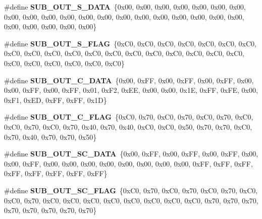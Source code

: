 \begin{DoxyCompactItemize}
\item 
\mbox{\label{unit-test-cpu-dispatch_8c_abfa2dcf4f03c6c5d74854d48aec18548}} 
\#define {\bfseries S\+U\+B\+\_\+\+O\+U\+T\+\_\+\+S\+\_\+\+D\+A\+TA}~\{0x00, 0x00, 0x00, 0x00, 0x00, 0x00, 0x00, 0x00, 0x00, 0x00, 0x00, 0x00, 0x00, 0x00, 0x00, 0x00, 0x00, 0x00, 0x00, 0x00, 0x00, 0x00, 0x00, 0x00, 0x00\}
\item 
\mbox{\label{unit-test-cpu-dispatch_8c_a9c9721a601578ce247115487e69375c6}} 
\#define {\bfseries S\+U\+B\+\_\+\+O\+U\+T\+\_\+\+S\+\_\+\+F\+L\+AG}~\{0x\+C0, 0x\+C0, 0x\+C0, 0x\+C0, 0x\+C0, 0x\+C0, 0x\+C0, 0x\+C0, 0x\+C0, 0x\+C0, 0x\+C0, 0x\+C0, 0x\+C0, 0x\+C0, 0x\+C0, 0x\+C0, 0x\+C0, 0x\+C0, 0x\+C0, 0x\+C0, 0x\+C0, 0x\+C0, 0x\+C0, 0x\+C0, 0x\+C0\}
\item 
\mbox{\label{unit-test-cpu-dispatch_8c_a82eed4c782439d39142ddbdd911090a0}} 
\#define {\bfseries S\+U\+B\+\_\+\+O\+U\+T\+\_\+\+C\+\_\+\+D\+A\+TA}~\{0x00, 0x\+F\+F, 0x00, 0x\+F\+F, 0x00, 0x\+F\+F, 0x00, 0x00, 0x\+F\+F, 0x00, 0x\+F\+F, 0x01, 0x\+F2, 0x\+E\+E, 0x00, 0x00, 0x1\+E, 0x\+F\+F, 0x\+F\+E, 0x00, 0x\+F1, 0x\+E\+D, 0x\+F\+F, 0x\+F\+F, 0x1\+D\}
\item 
\mbox{\label{unit-test-cpu-dispatch_8c_a740c259cf08a9a231c29d4de0015673c}} 
\#define {\bfseries S\+U\+B\+\_\+\+O\+U\+T\+\_\+\+C\+\_\+\+F\+L\+AG}~\{0x\+C0, 0x70, 0x\+C0, 0x70, 0x\+C0, 0x70, 0x\+C0, 0x\+C0, 0x70, 0x\+C0, 0x70, 0x40, 0x70, 0x40, 0x\+C0, 0x\+C0, 0x50, 0x70, 0x70, 0x\+C0, 0x70, 0x40, 0x70, 0x70, 0x50\}
\item 
\mbox{\label{unit-test-cpu-dispatch_8c_aae8a6a7276a1df10c3a7ed1766a3bf3b}} 
\#define {\bfseries S\+U\+B\+\_\+\+O\+U\+T\+\_\+\+S\+C\+\_\+\+D\+A\+TA}~\{0x00, 0x\+F\+F, 0x00, 0x\+F\+F, 0x00, 0x\+F\+F, 0x00, 0x00, 0x\+F\+F, 0x00, 0x00, 0x00, 0x00, 0x00, 0x00, 0x00, 0x00, 0x\+F\+F, 0x\+F\+F, 0x\+F\+F, 0x\+F\+F, 0x\+F\+F, 0x\+F\+F, 0x\+F\+F, 0x\+F\+F\}
\item 
\mbox{\label{unit-test-cpu-dispatch_8c_a17607a97ae4b0294acd737762fce6982}} 
\#define {\bfseries S\+U\+B\+\_\+\+O\+U\+T\+\_\+\+S\+C\+\_\+\+F\+L\+AG}~\{0x\+C0, 0x70, 0x\+C0, 0x70, 0x\+C0, 0x70, 0x\+C0, 0x\+C0, 0x70, 0x\+C0, 0x\+C0, 0x\+C0, 0x\+C0, 0x\+C0, 0x\+C0, 0x\+C0, 0x\+C0, 0x70, 0x70, 0x70, 0x70, 0x70, 0x70, 0x70, 0x70\}

\end{DoxyCompactItemize}
